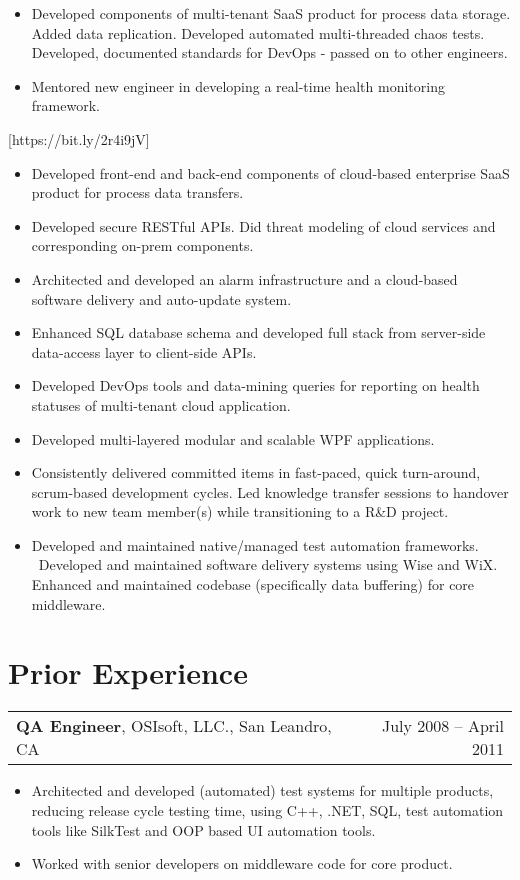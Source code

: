 \documentclass[letterpaper,10pt]{article}
\makeatletter
\newcommand{\experienceItem}[3]{
	\begin{tabular*}{\textwidth}{c@{\extracolsep{\fill}}c}
		\multicolumn{1}{l}{\textbf{#1}, #2} & \multicolumn{1}{r}{#3}\\
	\end{tabular*}\vspace{-10pt}
}
\newcommand{\resumeItemListStart}{\begin{itemize}}
\newcommand{\resumeItemListEnd}{\end{itemize}}
\newcommand{\resumeListItem}[1]{
	\item{#1 \vspace{-6pt}}
}
\makeatother
\begin{document}
	\resumeItemListStart
	\resumeListItem {Developed components of multi-tenant SaaS product for process data storage. Added data replication. Developed automated multi-threaded chaos tests. Developed, documented standards for DevOps -  passed on to other engineers.}
	\resumeListItem {Mentored new engineer in developing a real-time health monitoring framework.}
	\resumeItemListEnd

	[https://bit.ly/2r4i9jV]
	
	\resumeItemListStart
	\resumeListItem {Developed front-end and back-end components of cloud-based enterprise SaaS product for process data transfers.}
	\resumeListItem {Developed secure RESTful APIs. Did threat modeling of cloud services and corresponding on-prem components.}
	\resumeListItem {Architected and developed an alarm infrastructure and a cloud-based software delivery and auto-update system.}
	\resumeListItem {Enhanced SQL database schema and developed full stack from server-side data-access layer to client-side APIs.}
	\resumeListItem {Developed DevOps tools and data-mining queries for reporting on health statuses of multi-tenant cloud application.}
	\resumeListItem {Developed multi-layered modular and scalable WPF applications.}
	\resumeListItem {Consistently delivered committed items in fast-paced, quick turn-around, scrum-based development cycles. Led knowledge transfer sessions to handover work to new team member(s) while transitioning to a R\&D project.}
	\resumeItemListEnd

	
	\resumeItemListStart
	\resumeListItem {Developed and maintained native/managed test automation frameworks. \ Developed and maintained software delivery systems using Wise and WiX. Enhanced and maintained codebase (specifically data buffering) for core middleware.}
	\resumeItemListEnd

	\section{Prior Experience}
	
	\experienceItem{QA Engineer}{OSIsoft, LLC., San Leandro, CA}{July 2008 -- April 2011}	
	\vspace{-8pt}
	\resumeItemListStart
	\resumeListItem {Architected and developed (automated) test systems for multiple products, reducing release cycle testing time, using C++, .NET, SQL, test automation tools like SilkTest and OOP based UI automation tools.}
	\resumeListItem {Worked with senior developers on middleware code for core product.}
	\resumeItemListEnd
	
\end{document}
